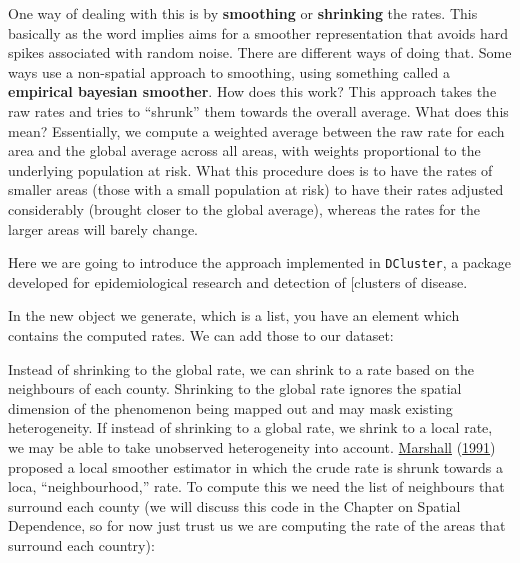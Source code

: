 \documentclass[
]{book}
\makeatletter
\newenvironment{Shaded}{\begin{snugshade}}{\end{snugshade}}
\newcommand{\DecValTok}[1]{\textcolor[rgb]{0.06,0.06,0.06}{#1}}
\newcommand{\FunctionTok}[1]{\textcolor[rgb]{0,0,0}{#1}}
\newcommand{\NormalTok}[1]{#1}
\newcommand{\OtherTok}[1]{\textcolor[rgb]{0.37,0.37,0.37}{#1}}
\newcommand{\SpecialCharTok}[1]{\textcolor[rgb]{0,0,0}{#1}}
\newenvironment{kframe}{%
\medskip{}
\setlength{\fboxsep}{.8em}
 \def\at@end@of@kframe{}%
 \ifinner\ifhmode%
  \def\at@end@of@kframe{\end{minipage}}%
  \begin{minipage}{\columnwidth}%
 \fi\fi%
 \def\FrameCommand##1{\hskip\@totalleftmargin \hskip-\fboxsep
 \colorbox{shadecolor}{##1}\hskip-\fboxsep
     \hskip-\linewidth \hskip-\@totalleftmargin \hskip\columnwidth}%
 \MakeFramed {\advance\hsize-\width
   \@totalleftmargin\z@ \linewidth\hsize
   \@setminipage}}%
 {\par\unskip\endMakeFramed%
 \at@end@of@kframe}
\renewenvironment{Shaded}{\begin{kframe}}{\end{kframe}}
\makeatother
\begin{document}
One way of dealing with this is by \textbf{smoothing} or \textbf{shrinking} the rates. This basically as the word implies aims for a smoother representation that avoids hard spikes associated with random noise. There are different ways of doing that. Some ways use a non-spatial approach to smoothing, using something called a \textbf{empirical bayesian smoother}. How does this work? This approach takes the raw rates and tries to ``shrunk'' them towards the overall average. What does this mean? Essentially, we compute a weighted average between the raw rate for each area and the global average across all areas, with weights proportional to the underlying population at risk. What this procedure does is to have the rates of smaller areas (those with a small population at risk) to have their rates adjusted considerably (brought closer to the global average), whereas the rates for the larger areas will barely change.

Here we are going to introduce the approach implemented in \texttt{DCluster}, a package developed for epidemiological research and detection of {[}clusters of disease.

\begin{Shaded}
\end{Shaded}

In the new object we generate, which is a list, you have an element which contains the computed rates. We can add those to our dataset:

\begin{Shaded}
\end{Shaded}

Instead of shrinking to the global rate, we can shrink to a rate based on the neighbours of each county. Shrinking to the global rate ignores the spatial dimension of the phenomenon being mapped out and may mask existing heterogeneity. If instead of shrinking to a global rate, we shrink to a local rate, we may be able to take unobserved heterogeneity into account. \protect\hyperlink{ref-Marshall_1991}{Marshall} (\protect\hyperlink{ref-Marshall_1991}{1991}) proposed a local smoother estimator in which the crude rate is shrunk towards a loca, ``neighbourhood,'' rate. To compute this we need the list of neighbours that surround each county (we will discuss this code in the Chapter on Spatial Dependence, so for now just trust us we are computing the rate of the areas that surround each country):
\end{document}
